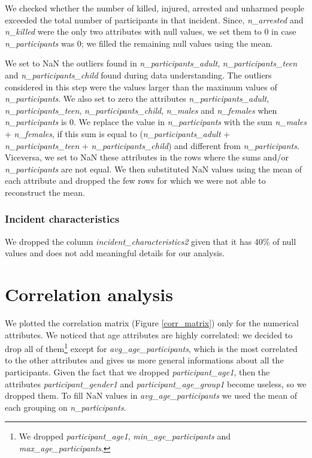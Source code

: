 \documentclass[10pt,a4paper]{report}
\begin{document}
We checked whether the number of killed, injured, arrested and unharmed people exceeded the total number of participants in that incident.
Since, \textit{n\_arrested} and \textit{n\_killed} were the only two attributes with null values, we set them to 0 in case \textit{n\_participants} was 0; we filled the remaining null values using the mean.

We set to NaN the outliers found in \textit{n\_participants\_adult}, \textit{n\_participants\_teen} and \textit{n\_participants\_child} found during data understanding.
The outliers considered in this step were the values larger than the maximum values of \textit{n\_participants}.
We also set to zero the attributes \textit{n\_participants\_adult}, \textit{n\_participants\_teen}, \textit{n\_participants\_child}, \textit{n\_males} and \textit{n\_females} when \textit{n\_participants} is 0.
We replace the value in \textit{n\_participants} with the sum \textit{n\_males} + \textit{n\_females}, if this sum is equal to (\textit{n\_participants\_adult} + \textit{n\_participants\_teen} + \textit{n\_participants\_child}) and different from \textit{n\_participants}.
Viceversa, we set to NaN these attributes in the rows where the sums and/or \textit{n\_participants} are not equal.
We then substituted NaN values using the mean of each attribute and dropped the few rows for which we were not able to reconstruct the mean.

\subsubsection{Incident characteristics}

We dropped the column \textit{incident\_characteristics2} given that it has 40\% of null values and does not add meaningful details for our analysis.

\section{Correlation analysis}

We plotted the correlation matrix (Figure \ref{corr_matrix}) only for the numerical attributes.
We noticed that age attributes are highly correlated: we decided to drop all of them\footnote{We dropped \textit{participant\_age1}, \textit{min\_age\_participants} and \textit{max\_age\_participants}.} except for \textit{avg\_age\_participants}, which is the most correlated to the other attributes and gives us more general informations about all the participants.
Given the fact that we dropped \textit{participant\_age1}, then the attributes \textit{participant\_gender1} and \textit{participant\_age\_group1} become useless, so we dropped them.
To fill NaN values in \textit{avg\_age\_participants} we used the mean of each grouping on \textit{n\_participants}.
\end{document}
